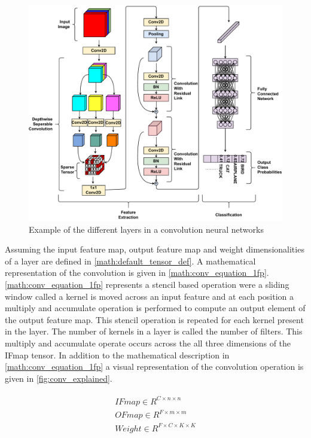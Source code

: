 \begin{figure}[ht]
    \centering
    \includegraphics[scale=0.4]{fig/cnn.pdf}
    \caption{Example of the different layers in a convolution neural networks}
    \label{fig:cnn_network}
\end{figure}


Assuming the input feature map, output feature map and weight dimensionalities
of a layer are defined in \autoref{math:default_tensor_def}. A mathematical
representation of the convolution is given in \autoref{math:conv_equation_1fp}.
\autoref{math:conv_equation_1fp} represents a stencil based operation were a
sliding window called a kernel is moved across an input feature and at each
position a multiply and accumulate operation is performed to compute an output
element of the output feature map. This stencil operation is repeated for each
kernel present in the layer. The number of kernels in a layer is called the
number of filters. This multiply and accumulate operate occurs across the all
three dimensions of the IFmap tensor. In addition to the mathematical
description in \autoref{math:conv_equation_1fp} a visual representation of the
convolution operation is given in \autoref{fig:conv_explained}.

\begin{align}
    \begin{split}
        IFmap \in R^{C \times n\times n} \\
        OFmap \in  R^{F \times m\times m} \\
        Weight \in R^{F \times C\times K\times K} \\
    \end{split}
    \label{math:default_tensor_def}
\end{align}

